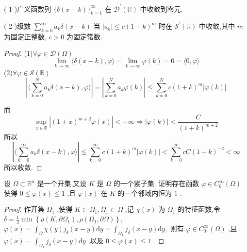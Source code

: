 \documentclass[lang=cn,newtx,10pt,scheme=chinese,thmcnt=chapter]{elegantbook}
\begin{document}
\begin{problemset}
( 1 )广义函数列 \(\{ \delta \left( {x - k}\right) {\} }_{k = 1}^{\infty }\) 在 \({\mathcal{D}}^{\prime }\left( \mathbb{R}\right)\) 中收敛到零元.

( 2 )级数 \(\mathop{\sum }\limits_{{k = 0}}^{\infty }{a}_{k}\delta \left( {x - k}\right)\) 当 \(\left| {a}_{k}\right|  \leqslant  c{\left( 1 + k\right) }^{m}\) 时在 \({\mathcal{S}}^{\prime }\left( \mathbb{R}\right)\) 中收敛,其中 \(m\) 为固定正整数, \(c > 0\) 为固定常数.
\begin{proof}
    (1)$\forall \varphi\in \mathcal{D}(\Omega)$
    \[
    \lim\limits_{k\to \infty }\langle\delta(x-k), \varphi\rangle=\lim\limits_{k\to \infty} \varphi(k)=0=\langle 0,\varphi\rangle
    \]
    (2)$\forall \varphi\in \mathcal{S}(\mathbb{R})$
    \[
  \left|  \langle\mathop{\sum }\limits_{{k = 0}}^{N}{a}_{k}\delta \left( {x - k}\right),\varphi\rangle\right|=\left| \mathop{\sum }\limits_{{k = 0}}^{N }{a}_{k}\varphi(k)\right|\leqslant \mathop{\sum }\limits_{{k = 0}}^{N }c(1+k)^m\left|\varphi(k)\right|
    \]

而\[
\sup\limits_{x\in\mathbb{R}}|(1+x)^{m+2}\varphi(x)|<+\infty\Rightarrow |\varphi (k)|<\frac{C}{(1+k)^{m+2}}
\]
所以
    \[
  \left|  \langle\mathop{\sum }\limits_{{k = 0}}^{\infty}{a}_{k}\delta \left( {x - k}\right),\varphi\rangle\right|\leqslant \mathop{\sum }\limits_{{k = 0}}^{\infty}c(1+k)^m\left|\varphi(k)\right|<\mathop{\sum }\limits_{{k = 0}}^{\infty}cC(1+k)^{-2}<\infty
    \]
    所以收敛.
\end{proof}
\item 设 \(\Omega  \subset  {\mathbb{R}}^{n}\) 是一个开集,又设 \(K\) 是 \(\Omega\) 的一个紧子集. 证明存在函数 \(\varphi  \in  {C}_{0}^{\infty }\left( \Omega \right)\) 使得 \(0 \leqslant  \varphi \left( x\right)  \leqslant  1\) ,且 \(\varphi \left( x\right)\) 在 \({K}\) 的一个邻域内恒为 1 .
\begin{proof}
作开集 \( {\Omega }_{1} \) ,使得 \( K \subset  {\Omega }_{1},{\bar{\Omega }}_{1} \subset  \Omega \) ,记 \( \chi \left( x\right) \) 为 \( {\Omega }_{1} \) 的特征函数,令
\( \delta  = \frac{1}{3}\min \left\{  {\rho \left( {K,\partial {\Omega }_{1}}\right) ,\rho \left( {{\Omega }_{1},\partial \Omega }\right) }\right\}  , \)
\( \varphi \left( x\right)  = {\int }_{\Omega }\chi \left( y\right) {j}_{\delta }\left( {x - y}\right) \mathrm{d}y = {\int }_{{\Omega }_{1}}{j}_{\delta }\left( {x - y}\right) \mathrm{d}y, \)
则有 \( \varphi  \in  {C}_{0}^{\infty }\left( \Omega \right) \) ,且 \( \varphi \left( x\right)  = {\int }_{{\Omega }_{1}}{j}_{\delta }\left( {x - y}\right) \mathrm{d}y \) ,以及
\( 0 \leqslant  \varphi \left( x\right)  \leqslant  1 \) .


\end{proof}
\end{problemset}
\end{document}
